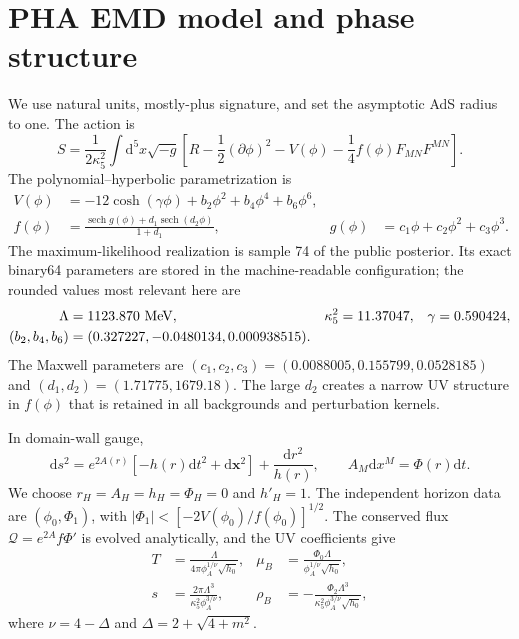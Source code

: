 \documentclass[11pt,a4paper]{article}
\newcommand{\dd}{\mathrm{d}}
\newcommand{\mub}{\mu_B}
\newcommand{\rhob}{\rho_B}
\begin{document}
\section{PHA EMD model and phase structure}
\label{sec:model}

We use natural units, mostly-plus signature, and set the asymptotic AdS radius
to one.  The action is
\begin{equation}
 S=\frac{1}{2\kappa_5^2}\int \dd^5x\sqrt{-g}\left[
 R-\frac12(\partial\phi)^2-V(\phi)-\frac14 f(\phi)F_{MN}F^{MN}\right].
 \label{eq:action}
\end{equation}
The polynomial--hyperbolic parametrization is
\begin{align}
 V(\phi)&=-12\cosh(\gamma\phi)+b_2\phi^2+b_4\phi^4+b_6\phi^6,\nonumber\\
 f(\phi)&=\frac{\operatorname{sech}g(\phi)
 +d_1\operatorname{sech}(d_2\phi)}{1+d_1},
 &g(\phi)&=c_1\phi+c_2\phi^2+c_3\phi^3.
 \label{eq:pha}
\end{align}
The maximum-likelihood realization is sample 74 of the public posterior.  Its
exact binary64 parameters are stored in the machine-readable configuration;
the rounded values most relevant here are
\begin{align}
 \Lambda&=1123.870\ {\rm MeV},& \kappa_5^2&=11.37047,&
 \gamma&=0.590424,\nonumber\\
 (b_2,b_4,b_6)&=(0.327227,-0.0480134,0.000938515).&&&
\end{align}
The Maxwell parameters are
$(c_1,c_2,c_3)=(0.0088005,0.155799,0.0528185)$ and
$(d_1,d_2)=(1.71775,1679.18)$.  The large $d_2$ creates a narrow UV structure
in $f(\phi)$ that is retained in all backgrounds and perturbation kernels.

In domain-wall gauge,
\begin{equation}
 \dd s^2=e^{2A(r)}[-h(r)\dd t^2+\dd\bm{x}^2]+\frac{\dd r^2}{h(r)},
 \qquad A_M\dd x^M=\Phi(r)\dd t .
 \label{eq:background}
\end{equation}
We choose $r_H=A_H=h_H=\Phi_H=0$ and $h'_H=1$.  The independent horizon data
are $(\phi_0,\Phi_1)$, with
$|\Phi_1|<[-2V(\phi_0)/f(\phi_0)]^{1/2}$.  The conserved flux
$\mathcal Q=e^{2A}f\Phi'$ is evolved analytically, and the UV coefficients give
\begin{align}
 T&=\frac{\Lambda}{4\pi\phi_A^{1/\nu}\sqrt{h_0}},&
 \mub&=\frac{\Phi_0\Lambda}{\phi_A^{1/\nu}\sqrt{h_0}},\nonumber\\
 s&=\frac{2\pi\Lambda^3}{\kappa_5^2\phi_A^{3/\nu}},&
 \rhob&=-\frac{\Phi_2\Lambda^3}
 {\kappa_5^2\phi_A^{3/\nu}\sqrt{h_0}},
 \label{eq:thermodynamics}
\end{align}
where $\nu=4-\Delta$ and $\Delta=2+\sqrt{4+m^2}$.
\end{document}
